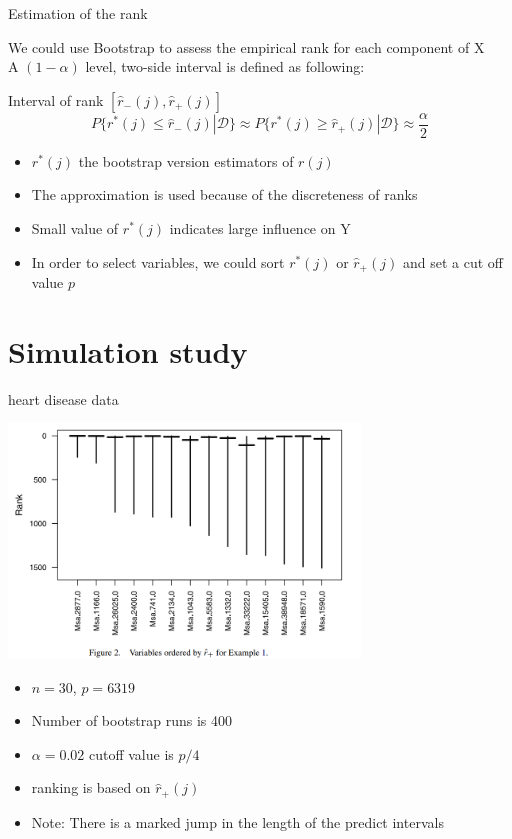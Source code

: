 \documentclass[ignorenonframetext,]{beamer}
\providecommand{\tightlist}{%
  \setlength{\itemsep}{0pt}\setlength{\parskip}{0pt}}
\begin{document}
\begin{frame}{Estimation of the rank}

We could use Bootstrap to assess the empirical rank for each component
of X\\
A \((1-\alpha)\) level, two-side interval is defined as following:

\begin{block}{Interval of rank $[\hat{r}_{-}(j), \hat{r}_{+}(j)]$}
\[
  P\{r^*(j)\leq \hat{r}_{-}(j)|\mathcal{D}\} \approx P\{r^*(j)\geq \hat{r}_{+}(j)|\mathcal{D}\} \approx \frac{\alpha}{2}
\]
\end{block}

\begin{itemize}
\tightlist
\item
  \(r^*(j)\) the bootstrap version estimators of \(r(j)\)
\item
  The approximation is used because of the discreteness of ranks
\item
  Small value of \(r^*(j)\) indicates large influence on Y
\item
  In order to select variables, we could sort \(r^*(j)\) or
  \(\hat{r}_{+}(j)\) and set a cut off value \(p\)
\end{itemize}

\end{frame}

\section{Simulation study}\label{simulation-study}

\begin{frame}{heart disease data}

\includegraphics[width=0.70000\textwidth]{./figure/rank_heart_diseas.png}

\begin{itemize}
\tightlist
\item
  \(n =30\), \(p = 6319\)
\item
  Number of bootstrap runs is 400
\item
  \(\alpha = 0.02\) cutoff value is \(p/4\)
\item
  ranking is based on \(\hat{r}_{+}(j)\)
\item
  Note: There is a marked jump in the length of the predict intervals
\end{itemize}

\end{frame}
\end{document}
